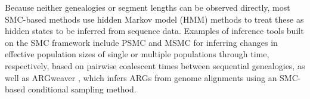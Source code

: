 \documentclass[11pt]{article}
\begin{document}
% 
% 
Because neither genealogies or segment lengths can
be observed directly, most SMC-based methods use 
hidden Markov model (HMM) methods to treat these as hidden states to
be inferred from sequence data. 
Examples of inference tools built on the SMC framework include 
PSMC \citep{li2011inference} and MSMC \citep{schiffels_inferring_2014}
for inferring changes in effective population sizes
of single or multiple populations through time, respectively, 
based on pairwise coalescent times between sequential genealogies, 
as well as ARGweaver \citep{rasmussen2014genome, hubisz2020inference}, 
which infers ARGs from genome alignments using an SMC-based 
conditional sampling method.

\end{document}
